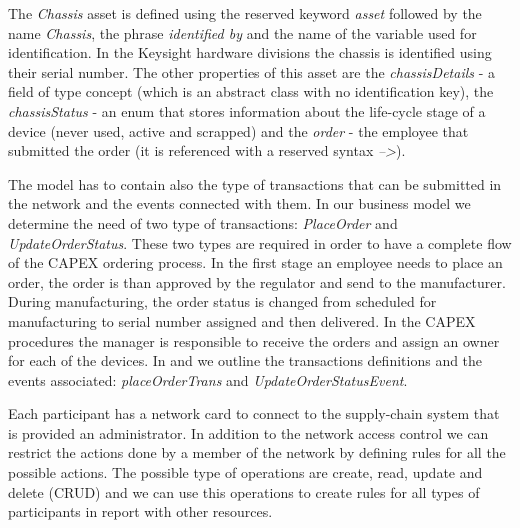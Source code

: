 

The \emph{Chassis} asset is defined using the reserved keyword \emph{asset} followed by the name \emph{Chassis}, the phrase \emph{identified by} and the name of the variable used for identification. In the Keysight hardware divisions the chassis is identified using their serial number. The other properties of this asset are the \emph{chassisDetails} - a field of type concept (which is an abstract class with no identification key), the \emph{chassisStatus} - an enum that stores information about the life-cycle stage of a device (never used, active and scrapped) and the \emph{order} - the employee that submitted the order (it is referenced with a reserved syntax \emph{-->}).

The model has to contain also the type of transactions that can be submitted in the network and the events connected with them. In our business model we determine the need of two type of transactions: \emph{PlaceOrder} and \emph{UpdateOrderStatus}.
These two types are required in order to have a complete flow of the CAPEX ordering process. In the first stage an employee needs to place an order, the order is than approved by the regulator and send to the manufacturer. During manufacturing, the order status is changed from scheduled for manufacturing to serial number assigned and then delivered. In the CAPEX procedures the manager is responsible to receive the orders and assign an owner for each of the devices. In  and  we outline the transactions definitions and the events associated: \emph{placeOrderTrans} and \emph{UpdateOrderStatusEvent}.





Each participant has a network card to connect to the supply-chain system that is provided an administrator. In addition to the network access control we can restrict the actions done by a member of the network by defining rules for all the possible actions. The possible type of operations are create, read, update and delete (CRUD) and we can use this operations to create rules for all types of participants in report with other resources. 

